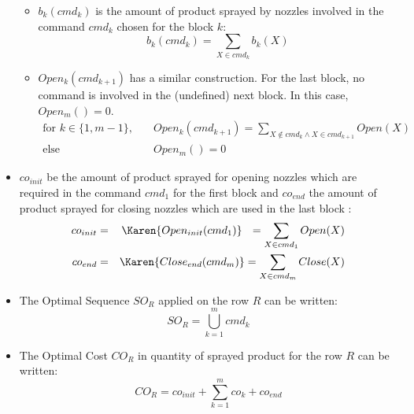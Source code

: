 \begin{itemize}
\begin{itemize}
\item $b_k(cmd_k)$ is the amount of product sprayed by nozzles involved in the command $cmd_k$ chosen for the block $k$: 
$$b_k(cmd_k) = \sum\limits_{X \in cmd_k} b_k(X)$$
\item $Open_k(cmd_{k+1})$ has a similar construction.
For the last block, no command is involved in the (undefined) next block. In this case, $Open_m()=0$.
\begin{align}
\text{for } k \in \{1,m-1\}, &  \quad Open_k(cmd_{k+1}) = \sum\limits_{X \notin cmd_k \wedge X \in cmd_{k+1}} Open(X) \nonumber \\
 \text{else} & \quad Open_m()=0 \label{eq:OpenNul}
\end{align}
\end{itemize}

\item $co_{init}$ be the amount of product sprayed for opening nozzles which are required in the command $cmd_1$ for the first block and $co_{end}$ the amount of product sprayed for closing nozzles which are used in the last block :
\begin{eqnarray*}
co_{init} & = & \Karen{Open_{init}(cmd_1)}\ \ = \sum\limits_{X \in cmd_1} Open(X) \\
 co_{end} & = & \Karen{Close_{end}(cmd_{m})} = \sum\limits_{X \in cmd_m} Close(X)
\end{eqnarray*}

\item  The Optimal Sequence $SO_R$ applied on the row $R$ can be written:
\begin{equation}
    SO_R  = \overset{m}{\underset{k=1}{\bigcup}} cmd_k  \label{eq:SOR}
\end{equation}
\item  The Optimal Cost $CO_R$ in quantity of sprayed product for the row $R$ can be written:
\begin{equation}
    CO_R  = co_{init} + \overset{m}{\underset{k=1}{\sum}} co_k + co_{end}  \label{eq:COR}
\end{equation}
\end{itemize}


